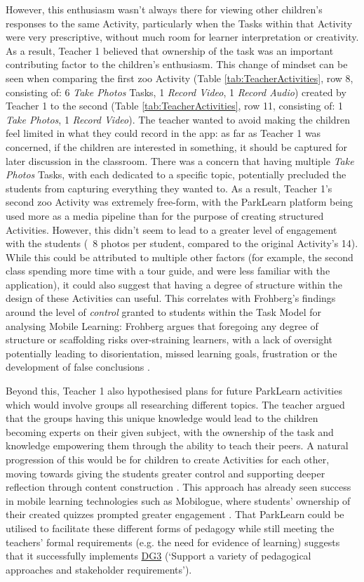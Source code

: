 However, this enthusiasm wasn't always there for viewing other children’s responses to the same Activity, particularly when the Tasks within that Activity were very prescriptive, without much room for learner interpretation or creativity. As a result, Teacher 1 believed that ownership of the task was an important contributing factor to the children’s enthusiasm. This change of mindset can be seen when comparing the first zoo Activity (Table \ref{tab:TeacherActivities}, row 8, consisting of: 6 \textit{Take Photos} Tasks, 1 \textit{Record Video}, 1 \textit{Record Audio}) created by Teacher 1 to the second (Table \ref{tab:TeacherActivities}, row 11, consisting of: 1 \textit{Take Photos}, 1 \textit{Record Video}). The teacher wanted to avoid making the children feel limited in what they could record in the app: as far as Teacher 1 was concerned, if the children are interested in something, it should be captured for later discussion in the classroom. There was a concern that having multiple \textit{Take Photos} Tasks, with each dedicated to a specific topic, potentially precluded the students from capturing everything they wanted to. As a result, Teacher 1's second zoo Activity was extremely free-form, with the ParkLearn platform being used more as a media pipeline than for the purpose of creating structured Activities. However, this didn't seem to lead to a greater level of engagement with the students (~8 photos per student, compared to the original Activity's 14). While this could be attributed to multiple other factors (for example, the second class spending more time with a tour guide, and were less familiar with the application), it could also suggest that having a degree of structure within the design of these Activities can useful. This correlates with Frohberg's findings around the level of \textit{control} granted to students within the Task Model for analysing Mobile Learning: Frohberg argues that foregoing any degree of structure or scaffolding risks over-straining learners, with a lack of oversight potentially leading to disorientation, missed learning goals, frustration or the development of false conclusions \citep{Frohberg2009}.

Beyond this, Teacher 1 also hypothesised plans for future ParkLearn activities which would involve groups all researching different topics. The teacher argued that the groups having this unique knowledge would lead to the children becoming experts on their given subject, with the ownership of the task and knowledge empowering them through the ability to teach their peers. A natural progression of this would be for children to create Activities for each other, moving towards giving the students greater control and supporting deeper reflection through content construction \citep{Frohberg2009, Heslop2017}. This approach has already seen success in mobile learning technologies such as Mobilogue, where students’ ownership of their created quizzes prompted greater engagement \citep{Giemza2013}. That ParkLearn could be utilised to facilitate these different forms of pedagogy while still meeting the teachers' formal requirements (e.g. the need for evidence of learning) suggests that it successfully implements \hyperref[DG3]{DG3} (`Support a variety of pedagogical approaches and stakeholder requirements').

